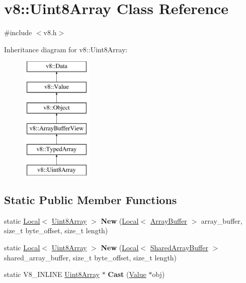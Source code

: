 \hypertarget{classv8_1_1Uint8Array}{}\section{v8\+:\+:Uint8\+Array Class Reference}
\label{classv8_1_1Uint8Array}


{\ttfamily \#include $<$v8.\+h$>$}

Inheritance diagram for v8\+:\+:Uint8\+Array\+:\begin{figure}[H]
\begin{center}
\leavevmode
\includegraphics[height=6.000000cm]{classv8_1_1Uint8Array}
\end{center}
\end{figure}
\subsection*{Static Public Member Functions}
\begin{DoxyCompactItemize}
\item 
\hypertarget{classv8_1_1Uint8Array_a8262a637cc67c57669adcf5a18bcd29a}{}static \hyperlink{classv8_1_1Local}{Local}$<$ \hyperlink{classv8_1_1Uint8Array}{Uint8\+Array} $>$ {\bfseries New} (\hyperlink{classv8_1_1Local}{Local}$<$ \hyperlink{classv8_1_1ArrayBuffer}{Array\+Buffer} $>$ array\+\_\+buffer, size\+\_\+t byte\+\_\+offset, size\+\_\+t length)\label{classv8_1_1Uint8Array_a8262a637cc67c57669adcf5a18bcd29a}

\item 
\hypertarget{classv8_1_1Uint8Array_a07d1f8e3377ddb6af3b423ed0d0f5d26}{}static \hyperlink{classv8_1_1Local}{Local}$<$ \hyperlink{classv8_1_1Uint8Array}{Uint8\+Array} $>$ {\bfseries New} (\hyperlink{classv8_1_1Local}{Local}$<$ \hyperlink{classv8_1_1SharedArrayBuffer}{Shared\+Array\+Buffer} $>$ shared\+\_\+array\+\_\+buffer, size\+\_\+t byte\+\_\+offset, size\+\_\+t length)\label{classv8_1_1Uint8Array_a07d1f8e3377ddb6af3b423ed0d0f5d26}

\item 
\hypertarget{classv8_1_1Uint8Array_a3bf7e458abe0be9bc943ba2de6c4f432}{}static V8\+\_\+\+I\+N\+L\+I\+N\+E \hyperlink{classv8_1_1Uint8Array}{Uint8\+Array} $\ast$ {\bfseries Cast} (\hyperlink{classv8_1_1Value}{Value} $\ast$obj)\label{classv8_1_1Uint8Array_a3bf7e458abe0be9bc943ba2de6c4f432}

\end{DoxyCompactItemize}
